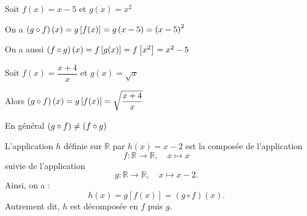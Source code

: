   \begin{example}
 
 Soit $ f(x)= x-5 $  et $ g(x)=x^{2} $
 
 
 On a $ \left(g\circ f\right)(x)=g\left[ f(x) \right]= g\left(x-5\right)=\left(x-5\right)^{2} $
 


  On a aussi $ \left(f\circ g\right)(x)=f\left[ g(x) \right]= f\left[ x^{2} \right]=x^{2}-5 $
 \end{example}

 
 \begin{example}
 
 Soit $ f(x)= \dfrac{x+4}{x} $  et $ g(x)=\sqrt{x} $

Alors \;  $ \left(g\circ f\right)(x)=g\left[ f(x) \right]= \sqrt{\dfrac{x+4}{x}} $
  \end{example}
 
 \begin{remark}
  En général $ \left(g\circ f\right) \neq  \left(f\circ g\right)$
 \end{remark}
 \begin{example}[Reconnaissance]
 
 L'application $h$ définie sur $\mathbb{R}$ par $h(x) = x - 2$ est la composée de l'application
\[
f : \mathbb{R} \longrightarrow \mathbb{R}, \quad x \longmapsto x
\]
suivie de l'application
\[
g : \mathbb{R} \longrightarrow \mathbb{R}, \quad x \longmapsto x - 2.
\]
Ainsi, on a : 
\[
h(x) = g[f(x)] = (g \circ f)(x).
\]
Autrement dit, $h$ est décomposée en $f$ puis $g$.

 \end{example}

